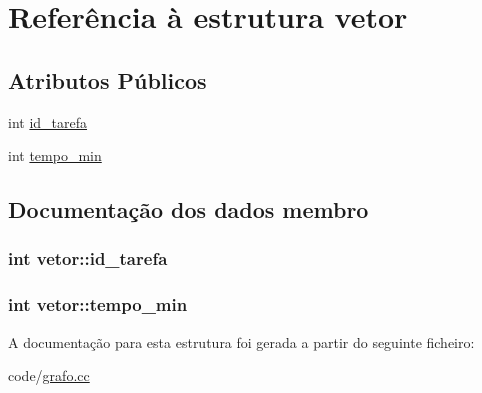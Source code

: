 \hypertarget{structvetor}{\section{Referência à estrutura vetor}
\label{structvetor}
}
\subsection*{Atributos Públicos}
\begin{DoxyCompactItemize}
\item 
int \hyperlink{structvetor_ab3b17d0ddfedcab54733c05868851565}{id\-\_\-tarefa}
\item 
int \hyperlink{structvetor_adff1a7b5c98b24c566ae273b5212938e}{tempo\-\_\-min}
\end{DoxyCompactItemize}


\subsection{Documentação dos dados membro}
\hypertarget{structvetor_ab3b17d0ddfedcab54733c05868851565}{
\subsubsection[{id\-\_\-tarefa}]{\setlength{\rightskip}{0pt plus 5cm}int vetor\-::id\-\_\-tarefa}}\label{structvetor_ab3b17d0ddfedcab54733c05868851565}
\hypertarget{structvetor_adff1a7b5c98b24c566ae273b5212938e}{
\subsubsection[{tempo\-\_\-min}]{\setlength{\rightskip}{0pt plus 5cm}int vetor\-::tempo\-\_\-min}}\label{structvetor_adff1a7b5c98b24c566ae273b5212938e}


A documentação para esta estrutura foi gerada a partir do seguinte ficheiro\-:\begin{DoxyCompactItemize}
\item 
code/\hyperlink{grafo_8cc}{grafo.\-cc}\end{DoxyCompactItemize}
